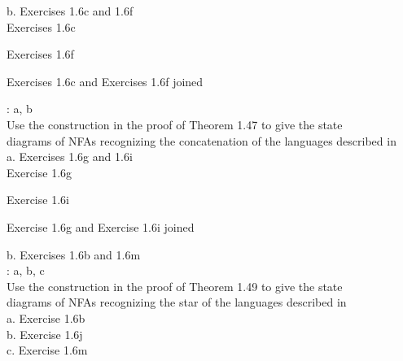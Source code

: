 \documentclass[12pt]{article}
\begin{document}
b. Exercises 1.6c and 1.6f \\

Exercises 1.6c


Exercises 1.6f


Exercises 1.6c and Exercises 1.6f joined



: a, b \\
Use the construction in the proof of Theorem 1.47 to give the state \\
diagrams of NFAs recognizing the concatenation of the languages described in \\

a. Exercises 1.6g and 1.6i \\

Exercise 1.6g


Exercise 1.6i


Exercise 1.6g and Exercise 1.6i joined


b. Exercises 1.6b and 1.6m \\


: a, b, c \\
Use the construction in the proof of Theorem 1.49 to give the state \\
diagrams of NFAs recognizing the star of the languages described in \\

a. Exercise 1.6b \\

b. Exercise 1.6j \\

c. Exercise 1.6m \\


 \\


 \\

\end{document}
